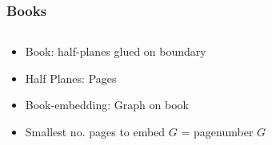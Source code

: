 \documentclass[english]{beamer}
\begin{document}
\begin{frame}
  \frametitle{Books}
  \begin{columns}
    \begin{column}{0.5\textwidth}
      \begin{itemize}
        \item Book: half-planes glued on boundary
        \item Half Planes: Pages
        \item Book-embedding: Graph on book
        \item Smallest no. pages to embed $G$ = pagenumber $G$
      \end{itemize}
    \end{column}
    \pause
    \begin{column}{0.5\textwidth}
        \begin{figure}
          \centering
          
        \end{figure}
    \end{column}
  \end{columns}
\end{frame}
\end{document}

